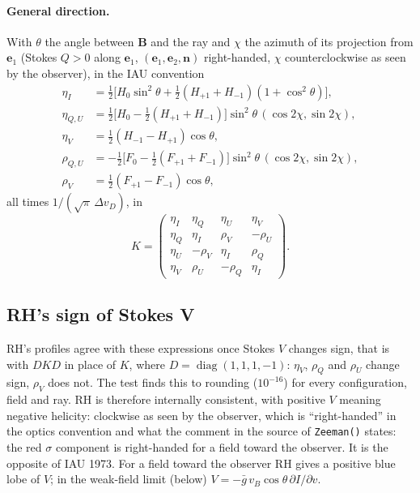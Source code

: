 \documentclass[11pt,a4paper]{article}
\newcommand{\code}[1]{\texttt{#1}}
\begin{document}
\paragraph{General direction.} With $\theta$ the angle between
$\boldsymbol B$ and the ray and $\chi$ the azimuth of its projection
from $\boldsymbol e_1$ (Stokes $Q>0$ along $\boldsymbol e_1$,
$(\boldsymbol e_1,\boldsymbol e_2,\boldsymbol n)$ right-handed, $\chi$
counterclockwise as seen by the observer), in the IAU convention
\begin{equation}
\begin{aligned}
\eta_I &= \tfrac12\bigl[H_0\sin^2\theta+\tfrac12(H_{+1}+H_{-1})(1+\cos^2\theta)\bigr],\\
\eta_{Q,U} &= \tfrac12\bigl[H_0-\tfrac12(H_{+1}+H_{-1})\bigr]\sin^2\theta\,(\cos2\chi,\sin2\chi),\\
\eta_V &= \tfrac12(H_{-1}-H_{+1})\cos\theta,\\
\rho_{Q,U} &= -\tfrac12\bigl[F_0-\tfrac12(F_{+1}+F_{-1})\bigr]\sin^2\theta\,(\cos2\chi,\sin2\chi),\\
\rho_V &= \tfrac12(F_{+1}-F_{-1})\cos\theta,
\end{aligned}
\end{equation}
all times $1/(\sqrt\pi\,\Delta v_D)$, in
\begin{equation}
K = \begin{pmatrix}
\eta_I & \eta_Q & \eta_U & \eta_V\\
\eta_Q & \eta_I & \rho_V & -\rho_U\\
\eta_U & -\rho_V & \eta_I & \rho_Q\\
\eta_V & \rho_U & -\rho_Q & \eta_I
\end{pmatrix}. \label{eq:Kmatrix}
\end{equation}

\subsection{RH's sign of Stokes V}
RH's profiles agree with these expressions once Stokes $V$ changes sign,
that is with $DKD$ in place of $K$, where $D=\operatorname{diag}(1,1,1,-1)$:
$\eta_V$, $\rho_Q$ and $\rho_U$ change sign, $\rho_V$ does not. The test finds this to rounding
($10^{-16}$) for every configuration, field and ray. RH is therefore
internally consistent, with positive $V$ meaning negative helicity:
clockwise as seen by the observer, which is ``right-handed'' in the
optics convention and what the comment in the source of \code{Zeeman()}
states: the red $\sigma$ component is right-handed for a field toward the
observer. It
is the opposite of IAU 1973. For a field toward the observer RH gives a
positive blue lobe of $V$; in the weak-field limit (below)
$V = -\bar g\,v_B\cos\theta\,\partial I/\partial v$.
\end{document}
